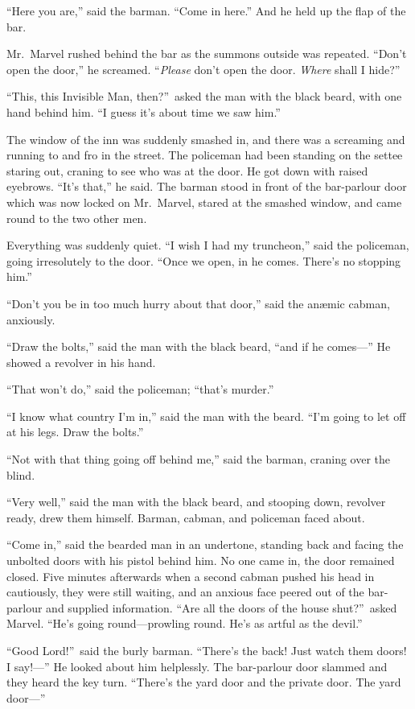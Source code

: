 “Here you are,” said the barman. “Come in here.” And he held up the flap of the bar.

Mr.\ Marvel rushed behind the bar as the summons outside was repeated. “Don’t open the door,” he screamed. “\emph{Please} don’t open the door. \emph{Where} shall I hide?”

“This, this Invisible Man, then?”\ asked the man with the black beard, with one hand behind him. “I guess it’s about time we saw him.”

The window of the inn was suddenly smashed in, and there was a screaming and running to and fro in the street. The policeman had been standing on the settee staring out, craning to see who was at the door. He got down with raised eyebrows. “It’s that,” he said. The barman stood in front of the bar-parlour door which was now locked on Mr.\ Marvel, stared at the smashed window, and came round to the two other men.

Everything was suddenly quiet. “I wish I had my trun\-cheon,” said the policeman, going irresolutely to the door. “Once we open, in he comes. There’s no stopping him.”

“Don’t you be in too much hurry about that door,” said the anæmic cabman, anxiously.

“Draw the bolts,” said the man with the black beard, “and if he comes—” He showed a revolver in his hand.

“That won’t do,” said the policeman; “that’s murder.”

“I know what country I’m in,” said the man with the beard. “I’m going to let off at his legs. Draw the bolts.”

“Not with that thing going off behind me,” said the barman, craning over the blind.

“Very well,” said the man with the black beard, and stooping down, revolver ready, drew them himself. Barman, cabman, and policeman faced about.

“Come in,” said the bearded man in an undertone, standing back and facing the unbolted doors with his pistol behind him. No one came in, the door remained closed. Five minutes afterwards when a second cabman pushed his head in cautiously, they were still waiting, and an anxious face peered out of the bar-parlour and supplied information. “Are all the doors of the house shut?”\ asked Marvel. “He’s going round—prowling round. He’s as artful as the devil.”

“Good Lord!”\ said the burly barman. “There’s the back! Just watch them doors! I say!—” He looked about him helplessly. The bar-parlour door slammed and they heard the key turn. “There’s the yard door and the private door. The yard door—”

